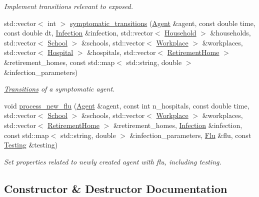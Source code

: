 \begin{DoxyCompactItemize}
\begin{DoxyCompactList}\small\item\em Implement transitions relevant to exposed. \end{DoxyCompactList}\item 
std\+::vector$<$ int $>$ \hyperlink{classTransitions_ac2ff2ba74f316f7c30a29682960e44f6}{symptomatic\+\_\+transitions} (\hyperlink{classAgent}{Agent} \&agent, const double time, const double dt, \hyperlink{classInfection}{Infection} \&infection, std\+::vector$<$ \hyperlink{classHousehold}{Household} $>$ \&households, std\+::vector$<$ \hyperlink{classSchool}{School} $>$ \&schools, std\+::vector$<$ \hyperlink{classWorkplace}{Workplace} $>$ \&workplaces, std\+::vector$<$ \hyperlink{classHospital}{Hospital} $>$ \&hospitals, std\+::vector$<$ \hyperlink{classRetirementHome}{Retirement\+Home} $>$ \&retirement\+\_\+homes, const std\+::map$<$ std\+::string, double $>$ \&infection\+\_\+parameters)
\begin{DoxyCompactList}\small\item\em \hyperlink{classTransitions}{Transitions} of a symptomatic agent. \end{DoxyCompactList}\item 
void \hyperlink{classTransitions_a2482934e9144b870a1a97a4470015ed4}{process\+\_\+new\+\_\+flu} (\hyperlink{classAgent}{Agent} \&agent, const int n\+\_\+hospitals, const double time, std\+::vector$<$ \hyperlink{classSchool}{School} $>$ \&schools, std\+::vector$<$ \hyperlink{classWorkplace}{Workplace} $>$ \&workplaces, std\+::vector$<$ \hyperlink{classRetirementHome}{Retirement\+Home} $>$ \&retirement\+\_\+homes, \hyperlink{classInfection}{Infection} \&infection, const std\+::map$<$ std\+::string, double $>$ \&infection\+\_\+parameters, \hyperlink{classFlu}{Flu} \&flu, const \hyperlink{classTesting}{Testing} \&testing)
\begin{DoxyCompactList}\small\item\em Set properties related to newly created agent with flu, including testing. \end{DoxyCompactList}\end{DoxyCompactItemize}


\subsection{Constructor \& Destructor Documentation}
\mbox{\label{classTransitions_a11c132ce29225616ff91901c544c35b4}} 
